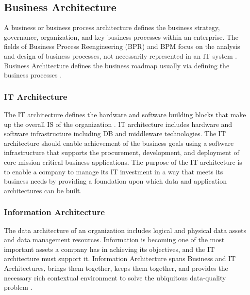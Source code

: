 \documentclass[12pt,a4paper,final,twoside,onecolumn,titlepage]{book}
\begin{document}
\subsection{Business Architecture}
A business or business process architecture defines the business strategy, governance, organization, and key business processes within an enterprise. The fields of Business Process Reengineering (BPR) and \gls{BPM} focus on the analysis and design of business processes, not necessarily represented in an IT system \cite{W26}. Business Architecture defines the business roadmap usually via defining the business processes \cite{M05}.
\subsubsection{IT Architecture}
The IT architecture defines the hardware and software building blocks that make up the overall \gls{IS} of the organization \cite{W26}. IT architecture includes hardware and software infrastructure including \gls{DB} and middleware technologies. The IT architecture should enable achievement of the business goals using a software infrastructure that supports the procurement, development, and deployment of core mission-critical business applications. The purpose of the IT architecture is to enable a company to manage its IT investment in a way that meets its business needs by providing a foundation upon which data and application architectures can be built.
\subsubsection{Information Architecture}
The data architecture of an organization includes logical and physical data assets and data management resources. Information is becoming one of the most important assets a company has in achieving its objectives, and the IT architecture must support it. Information Architecture spans Business and IT Architectures, brings them together, keeps them together, and provides the necessary rich contextual environment to solve the ubiquitous data-quality problem \cite{M06}.
\end{document}
